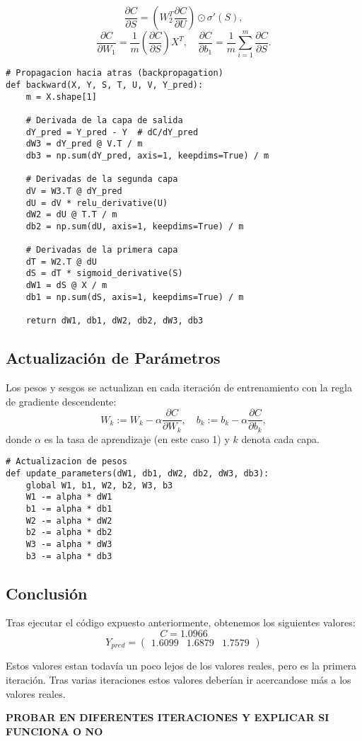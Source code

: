 \documentclass[paper=a4, fontsize=11pt]{scrartcl} %
\numberwithin{equation}{section} %
\numberwithin{figure}{section} %
\numberwithin{table}{section} %
\begin{document}
\[
\frac{\partial C}{\partial S} = \left( W_2^T \frac{\partial C}{\partial U} \right) \odot \sigma'(S),
\]
\[
\frac{\partial C}{\partial W_1} = \frac{1}{m} \left( \frac{\partial C}{\partial S} \right) X^T, \quad \frac{\partial C}{\partial b_1} = \frac{1}{m} \sum_{i=1}^m \frac{\partial C}{\partial S}.
\]

\vspace{2mm}
\begin{lstlisting}
# Propagacion hacia atras (backpropagation)
def backward(X, Y, S, T, U, V, Y_pred):
    m = X.shape[1]

    # Derivada de la capa de salida
    dY_pred = Y_pred - Y  # dC/dY_pred
    dW3 = dY_pred @ V.T / m
    db3 = np.sum(dY_pred, axis=1, keepdims=True) / m

    # Derivadas de la segunda capa
    dV = W3.T @ dY_pred
    dU = dV * relu_derivative(U)
    dW2 = dU @ T.T / m
    db2 = np.sum(dU, axis=1, keepdims=True) / m

    # Derivadas de la primera capa
    dT = W2.T @ dU
    dS = dT * sigmoid_derivative(S)
    dW1 = dS @ X / m
    db1 = np.sum(dS, axis=1, keepdims=True) / m

    return dW1, db1, dW2, db2, dW3, db3
\end{lstlisting}
\vspace{2mm}

\subsection{Actualización de Parámetros}

Los pesos y sesgos se actualizan en cada iteración de entrenamiento con la regla de gradiente descendente:
\[
W_k := W_k - \alpha \frac{\partial C}{\partial W_k}, \quad b_k := b_k - \alpha \frac{\partial C}{\partial b_k},
\]
donde $\alpha$ es la tasa de aprendizaje (en este caso 1) y $k$ denota cada capa.

\vspace{2mm}
\begin{lstlisting}
# Actualizacion de pesos
def update_parameters(dW1, db1, dW2, db2, dW3, db3):
    global W1, b1, W2, b2, W3, b3
    W1 -= alpha * dW1
    b1 -= alpha * db1
    W2 -= alpha * dW2
    b2 -= alpha * db2
    W3 -= alpha * dW3
    b3 -= alpha * db3
\end{lstlisting}

\subsection{Conclusión}

Tras ejecutar el código expuesto anteriormente, obtenemos los siguientes valores:
\[
C = 1.0966
\]
\[
Y_{pred} = \begin{pmatrix} 1.6099 & 1.6879 & 1.7579 \end{pmatrix}
\]

Estos valores estan todavía un poco lejos de los valores reales, pero es la primera iteración.  Tras varias iteraciones estos valores deberían ir acercandose más a los valores reales.


\color{red}
\textbf{PROBAR EN DIFERENTES ITERACIONES Y EXPLICAR SI FUNCIONA O NO}
\end{document}
